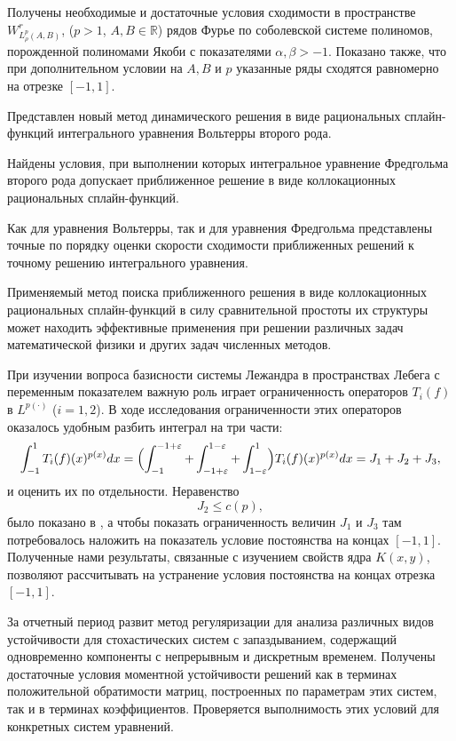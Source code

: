 Получены необходимые и достаточные условия сходимости в пространстве $W^r_{L^p_\rho(A,B)}$, ($p > 1$, $A, B \in \mathbb{R}$) рядов Фурье по соболевской системе полиномов, порожденной полиномами Якоби с показателями $\alpha, \beta  > -1$. Показано также, что при дополнительном условии на $A, B$ и $p$ указанные ряды сходятся равномерно на отрезке $[-1,1]$.


Представлен новый метод динамического решения в виде рациональных
сплайн-функций интегрального уравнения Вольтерры второго рода.

Найдены условия, при выполнении которых интегральное уравнение
Фредгольма второго рода допускает приближенное решение в виде
коллокационных рациональных сплайн-функций.

Как для уравнения Вольтерры, так и для уравнения Фредгольма
представлены точные по порядку оценки скорости сходимости
приближенных решений к точному решению интегрального уравнения.

Применяемый метод поиска приближенного решения в виде
коллокационных рациональных сплайн-функций в силу
сравнительной простоты их структуры
может находить эффективные применения
при решении различных задач математической
физики и других задач численных методов.


При изучении вопроса базисности системы Лежандра в пространствах Лебега с переменным показателем важную роль играет ограниченность операторов $T_i(f)$ в $L^{p(\cdot)}$ ($i=1,2$). В ходе исследования ограниченности  этих операторов  оказалось удобным разбить интеграл на три части:
\begin{equation*}
\int_{-1}^1 T_i(f)(x)^{p(x)}dx=\Bigl(\int_{-1}^{-1+\varepsilon} + \int_{-1+\varepsilon}^{1-\varepsilon} + \int_{1-\varepsilon}^{1}\Bigr)T_i(f)(x)^{p(x)}dx=J_1+J_2+J_3,
\end{equation*}
и оценить их по отдельности. Неравенство
$$
J_2\le c(p),
$$
было показано в \cite{tad-SHII-Leg}, а чтобы показать ограниченность величин $J_1$ и $J_3$ там потребовалось наложить на показатель условие постоянства на концах $[-1,1]$. Полученные нами результаты, связанные с изучением свойств ядра $K(x,y)$, позволяют рассчитывать на устранение условия постоянства на концах отрезка $[-1,1]$.

За отчетный период развит метод регуляризации для анализа различных видов устойчивости  для  стохастических систем с запаздыванием, содержащий одновременно компоненты с непрерывным и дискретным временем. Получены  достаточные условия моментной устойчивости решений как в терминах положительной обратимости матриц, построенных по параметрам этих систем, так и в терминах коэффициентов. Проверяется выполнимость этих условий для конкретных систем уравнений.

